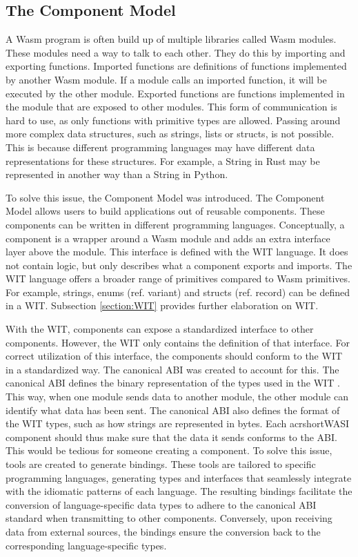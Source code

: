 \subsection{The Component Model}
\label{section:thecomponentmodel}

A \acrshort{Wasm} program is often build up of multiple libraries called Wasm modules. These modules need a way to talk to each other. They do this by importing and exporting functions. Imported functions are definitions of functions implemented by another Wasm module. If a module calls an imported function, it will be executed by the other module. Exported functions are functions implemented in the module that are exposed to other modules. 
This form of communication is hard to use, as only functions with primitive types are allowed. Passing around more complex data structures, such as strings, lists or structs, is not possible. This is because different programming languages may have different data representations for these structures. For example, a String in Rust may be represented in another way than a String in Python.

To solve this issue, the Component Model was introduced. The Component Model allows users to build applications out of reusable components. These components can be written in different programming languages. Conceptually, a component is a wrapper around a \acrshort{Wasm} module and adds an extra interface layer above the module. This interface is defined with the \acrshort{WIT} language. It does not contain logic, but only describes what a component exports and imports. The \acrshort{WIT} language offers a broader range of primitives compared to \acrshort{Wasm} primitives. For example, strings, enums (ref. variant) and structs (ref. record) can be defined in a \acrshort{WIT}. Subsection \ref{section:WIT} provides further elaboration on WIT.

With the \acrshort{WIT}, components can expose a standardized interface to other components. However, the \acrshort{WIT} only contains the definition of that interface. For correct utilization of this interface, the components should conform to the \acrshort{WIT} in a standardized way. The canonical \acrshort{ABI} was created to account for this. The canonical \acrshort{ABI} defines the binary representation of the types used in the \acrshort{WIT} \cite{canonical_abi}. This way, when one module sends data to another module, the other module can identify what data has been sent. The canonical \acrshort{ABI} also defines the format of the \acrshort{WIT} types, such as how strings are represented in bytes. Each acrshort{WASI} component should thus make sure that the data it sends conforms to the ABI. This would be tedious for someone creating a component. To solve this issue, tools are created to generate bindings. These tools are tailored to specific programming languages, generating types and interfaces that seamlessly integrate with the idiomatic patterns of each language. The resulting bindings facilitate the conversion of language-specific data types to adhere to the canonical ABI standard when transmitting to other components. Conversely, upon receiving data from external sources, the bindings ensure the conversion back to the corresponding language-specific types.

